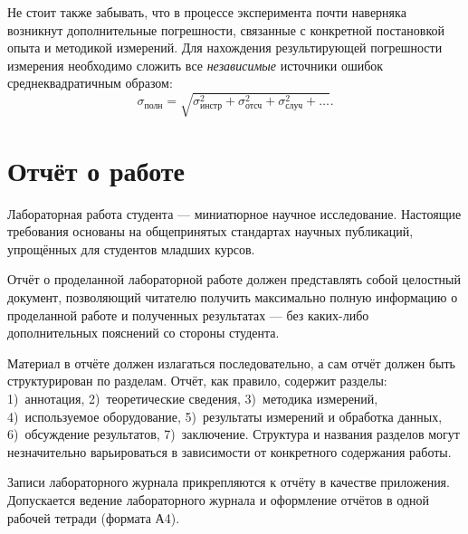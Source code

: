 Не стоит также забывать, что в процессе эксперимента почти наверняка
возникнут дополнительные погрешности, связанные с конкретной постановкой
опыта и методикой измерений. Для нахождения результирующей погрешности
измерения необходимо сложить все \emph{независимые} источники ошибок
среднеквадратичным образом:
\[\sigma_{\text{полн}}=\sqrt{\sigma_{\text{инстр}}^{2}+
\sigma_{\text{отсч}}^{2}+\sigma_{\text{случ}}^{2}+\ldots}.\]



\section{Отчёт о работе}\label{sec:report}

Лабораторная работа студента --- миниатюрное научное исследование.
Настоящие требования основаны на общепринятых стандартах научных публикаций,
упрощённых для студентов младших курсов.

Отчёт о проделанной лабораторной работе должен представлять собой
целостный документ, позволяющий читателю получить максимально полную
информацию о проделанной работе и полученных результатах ---
без каких-либо дополнительных пояснений со стороны студента.

Материал в отчёте должен излагаться последовательно, а сам отчёт должен
быть структурирован по разделам. Отчёт, как правило, содержит разделы:
1)~аннотация, 2)~теоретические сведения, 3)~методика измерений,
4)~используемое оборудование, 5)~результаты измерений и обработка данных,
6)~обсуждение результатов, 7)~заключение. Структура и названия разделов
могут незначительно варьироваться в зависимости от конкретного содержания
работы.

Записи лабораторного журнала прикрепляются к отчёту в качестве приложения.
Допускается ведение лабораторного журнала и оформление отчётов в одной
рабочей тетради (формата А4).


